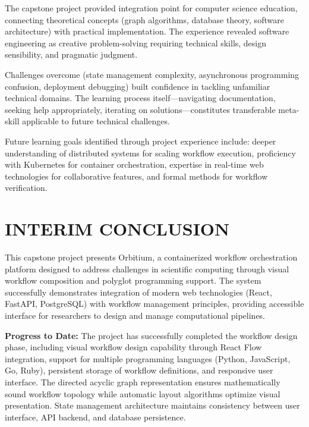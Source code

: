 \documentclass[12pt]{article}
\begin{document}
\hspace{\parindent}The capstone project provided integration point for computer science education, connecting theoretical concepts (graph algorithms, database theory, software architecture) with practical implementation. The experience revealed software engineering as creative problem-solving requiring technical skills, design sensibility, and pragmatic judgment.

Challenges overcome (state management complexity, asynchronous programming confusion, deployment debugging) built confidence in tackling unfamiliar technical domains. The learning process itself—navigating documentation, seeking help appropriately, iterating on solutions—constitutes transferable meta-skill applicable to future technical challenges.

Future learning goals identified through project experience include: deeper understanding of distributed systems for scaling workflow execution, proficiency with Kubernetes for container orchestration, expertise in real-time web technologies for collaborative features, and formal methods for workflow verification.

\newpage
\section{INTERIM CONCLUSION}

\hspace{\parindent}This capstone project presents Orbitium, a containerized workflow orchestration platform designed to address challenges in scientific computing through visual workflow composition and polyglot programming support. The system successfully demonstrates integration of modern web technologies (React, FastAPI, PostgreSQL) with workflow management principles, providing accessible interface for researchers to design and manage computational pipelines.

\hspace{\parindent}\textbf{Progress to Date:} The project has successfully completed the workflow design phase, including visual workflow design capability through React Flow integration, support for multiple programming languages (Python, JavaScript, Go, Ruby), persistent storage of workflow definitions, and responsive user interface. The directed acyclic graph representation ensures mathematically sound workflow topology while automatic layout algorithms optimize visual presentation. State management architecture maintains consistency between user interface, API backend, and database persistence.
\end{document}
